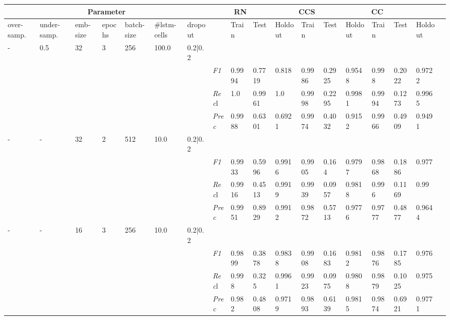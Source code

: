 \begin{table}[]
\tiny
\tabcolsep=0.11cm
\begin{tabularx}{\textwidth}{XXXXXXX|X|XXX|XXX|XXXX}
\toprule
\multicolumn{7}{c}{Parameter} & \multicolumn{3}{c}{RN} & \multicolumn{3}{c}{CCS} & \multicolumn{3}{c}{CC} \\ \midrule
over-\newline samp. & under-\newline samp. & emb-\newline size & epochs &batch-\newline size & \#lstm-\newline cells & dropout & & Train &  Test & Holdout & Train &  Test & Holdout & Train &  Test & Holdout \\ \midrule
- & 0.5 & 32 & 3 & 256 &100.0 & 0.2|0.2 & & & & & & & & & \\
& & & & & & & \textit{F1} & 0.9994 & 0.7719 & 0.818 & 0.9986 & 0.2925        & 0.9548        & 0.998        & 0.2022        & 0.9722        \\
& & & & & & & \textit{Rec}l & 1.0 & 0.9961 & 1.0    & 0.9998 & 0.2295    & 0.9981    & 0.9994    & 0.1273    & 0.9965    \\
& & & & & & & \textit{Prec} & 0.9988 & 0.6301 & 0.6921 & 0.9974 & 0.4032 & 0.9152 & 0.9966 & 0.4909 & 0.9491 \\ \midrule
- & - & 32 & 2 & 512 &10.0 & 0.2|0.2 & & & & & & & & & \\
& & & & & & & \textit{F1} & 0.9933 & 0.5996 & 0.9916 & 0.9905 & 0.164        & 0.9797        & 0.9868        & 0.1886        & 0.977        \\
& & & & & & & \textit{Rec}l & 0.9916 & 0.4513 & 0.9919    & 0.9939 & 0.0957    & 0.9818    & 0.996    & 0.1169    & 0.99    \\
& & & & & & & \textit{Prec} & 0.9951 & 0.8929 & 0.9912 & 0.9872 & 0.5713 & 0.9776 & 0.9777 & 0.4877 & 0.9644 \\ \midrule
- & - & 16 & 3 & 256 &10.0 & 0.2|0.2 & & & & & & & & & \\
& & & & & & & \textit{F1} & 0.9899 & 0.3878 & 0.9838 & 0.9908 & 0.1683        & 0.9812        & 0.9876        & 0.1785        & 0.976        \\
& & & & & & & \textit{Rec}l & 0.998 & 0.325 & 0.9961    & 0.9923 & 0.0975    & 0.9808    & 0.9879    & 0.1025    & 0.975    \\
& & & & & & & \textit{Prec} & 0.982 & 0.4808 & 0.9719 & 0.9893 & 0.6139 & 0.9815 & 0.9874 & 0.6921 & 0.9771 \\ \midrule

\end{tabularx}
\end{table}
